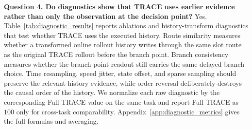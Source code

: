 \documentclass{article}
\begin{document}
\textbf{Question 4. Do diagnostics show that TRACE uses earlier evidence rather than only the observation at the decision point?}
Yes. Table~\ref{tab:diagnostic_results} reports ablations and history-transform diagnostics that test whether TRACE uses the executed history. Route similarity measures whether a transformed online rollout history writes through the same slot route as the original TRACE rollout before the branch point. Branch consistency measures whether the branch-point readout still carries the same delayed branch choice. Time resampling, speed jitter, state offset, and sparse sampling should preserve the relevant history evidence, while order reversal deliberately destroys the causal order of the history. We normalize each raw diagnostic by the corresponding Full TRACE value on the same task and report Full TRACE as $100$ only for cross-task comparability. Appendix~\ref{app:diagnostic_metrics} gives the full formulas and averaging.
\end{document}
